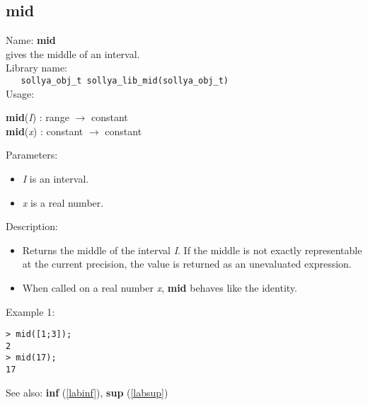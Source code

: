 \subsection{mid}
\label{labmid}
\noindent Name: \textbf{mid}\\
\phantom{aaa}gives the middle of an interval.\\[0.2cm]
\noindent Library name:\\
\verb|   sollya_obj_t sollya_lib_mid(sollya_obj_t)|\\[0.2cm]
\noindent Usage: 
\begin{center}
\textbf{mid}(\emph{I}) : \textsf{range} $\rightarrow$ \textsf{constant}\\
\textbf{mid}(\emph{x}) : \textsf{constant} $\rightarrow$ \textsf{constant}\\
\end{center}
Parameters: 
\begin{itemize}
\item \emph{I} is an interval.
\item \emph{x} is a real number.
\end{itemize}
\noindent Description: \begin{itemize}

\item Returns the middle of the interval \emph{I}. If the middle is not exactly
   representable at the current precision, the value is returned as an
   unevaluated expression.

\item When called on a real number \emph{x}, \textbf{mid} behaves like the identity.
\end{itemize}
\noindent Example 1: 
\begin{center}\begin{minipage}{15cm}\begin{Verbatim}[frame=single,commandchars=\\\|\~]
> mid([1;3]);
2
> mid(17);
17
\end{Verbatim}
\end{minipage}\end{center}
See also: \textbf{inf} (\ref{labinf}), \textbf{sup} (\ref{labsup})
